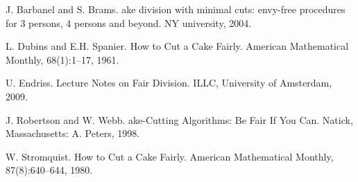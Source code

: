 \begin{thebibliography}{1}

J. Barbanel and S. Brams.
ake division with minimal cuts: envy-free procedures for 3 persons, 4 persons and beyond.
\newblock NY university, 2004.

L. Dubins and E.H. Spanier. 
\newblock How to Cut a Cake Fairly. 
\newblock American Mathematical Monthly, 68(1):1–17, 1961.

U. Endriss. 
\newblock Lecture Notes on Fair Division. 
\newblock ILLC, University of Amsterdam, 2009.

J. Robertson and W. Webb.
ake-{C}utting Algorithms: Be Fair If You Can.
\newblock Natick, Massachusetts: A. Peters, 1998.

W. Stromquist.
\newblock How to Cut a Cake Fairly. 
\newblock American Mathematical Monthly, 87(8):640–644, 1980.

 
\end{thebibliography}{}

